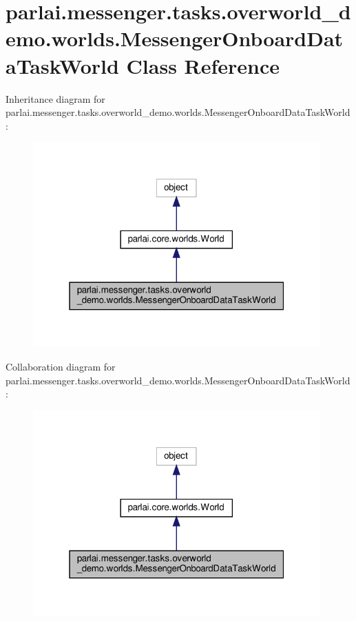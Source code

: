 \hypertarget{classparlai_1_1messenger_1_1tasks_1_1overworld__demo_1_1worlds_1_1MessengerOnboardDataTaskWorld}{}\section{parlai.\+messenger.\+tasks.\+overworld\+\_\+demo.\+worlds.\+Messenger\+Onboard\+Data\+Task\+World Class Reference}
\label{classparlai_1_1messenger_1_1tasks_1_1overworld__demo_1_1worlds_1_1MessengerOnboardDataTaskWorld}


Inheritance diagram for parlai.\+messenger.\+tasks.\+overworld\+\_\+demo.\+worlds.\+Messenger\+Onboard\+Data\+Task\+World\+:
\nopagebreak
\begin{figure}[H]
\begin{center}
\leavevmode
\includegraphics[width=313pt]{classparlai_1_1messenger_1_1tasks_1_1overworld__demo_1_1worlds_1_1MessengerOnboardDataTaskWorld__inherit__graph}
\end{center}
\end{figure}


Collaboration diagram for parlai.\+messenger.\+tasks.\+overworld\+\_\+demo.\+worlds.\+Messenger\+Onboard\+Data\+Task\+World\+:
\nopagebreak
\begin{figure}[H]
\begin{center}
\leavevmode
\includegraphics[width=313pt]{classparlai_1_1messenger_1_1tasks_1_1overworld__demo_1_1worlds_1_1MessengerOnboardDataTaskWorld__coll__graph}
\end{center}
\end{figure}
